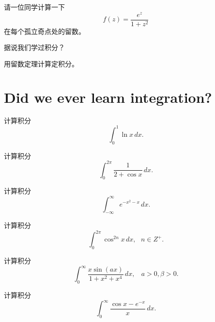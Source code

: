 \documentclass[CJK]{beamer}
\date{}
\begin{document}


\begin{frame}
  \bch
  请一位同学计算一下$$f(z) = \frac{e^z}{1+z^2}$$在每个孤立奇点处的留数。
  \ech
\end{frame}


\begin{frame}
\bch
\bitem
\item{据说我们学过积分？}
\item{用留数定理计算定积分。}
 \eitem
\ech
\end{frame}


\section{Did we ever learn integration?}


\begin{frame}
  \bch

  计算积分$$ \int_0^1 \ln x \, dx. $$
  \ech
\end{frame}

\begin{frame}
  \bch

  计算积分$$ \int_0^{2\pi}\frac{1}{2+\cos x} \, dx. $$
  \ech
\end{frame}


\begin{frame}
  \bch

  计算积分$$ \int_{-\infty}^\infty e^{-x^2-x} \, dx .$$
  \ech
\end{frame}

\begin{frame}
  \bch

  计算积分$$ \int_0^{2\pi} \cos^{2n}x\, dx,\ \ \ n \in Z^+. $$
  \ech
\end{frame}

\begin{frame}
  \bch
  计算积分$$\int_0^\infty \frac{x\sin{(ax)}}{1+x^2+x^4}\,dx, \ \ \ \ a>0, \beta>0.$$
  \ech
\end{frame}

\begin{frame}
  \bch
  计算积分$$ \int_0^{\infty} \frac{\cos{x} - e^{-x}}{x}\, dx.$$
  \ech
\end{frame}
\end{document}

